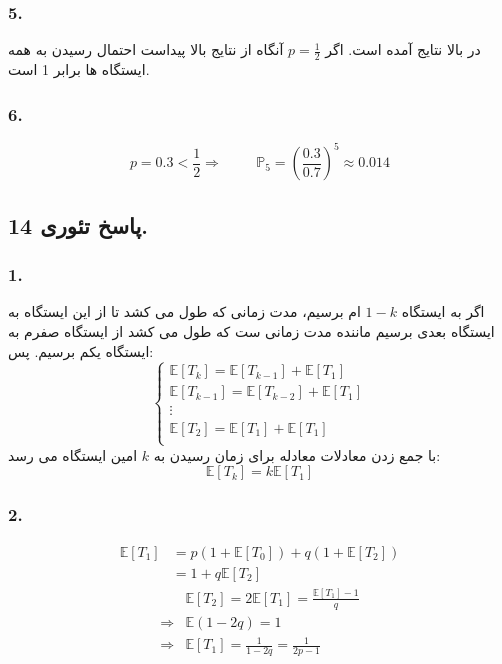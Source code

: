 \documentclass[]{article}
\begin{document}
 \subsubsection{5.}
 در بالا نتایج آمده است. اگر
 $p = \frac{1}{2}$
 آنگاه از نتایج بالا پیداست احتمال رسیدن به همه ایستگاه ها برابر 1 است.
 \subsubsection{6.}
 \begin{equation}
 	\nonumber
 	p = 0.3 < \frac{1}{2} \Rightarrow \hspace{1cm} \mathbb{P}_5 = (\frac{0.3}{0.7})^5 \approx 0.014
 \end{equation}
 \newpage
 \subsection{پاسخ تئوری 14.}
 \subsubsection{1.}
 اگر به ایستگاه $1 - k$ ام برسیم، مدت زمانی که طول می کشد تا از این ایستگاه به ایستگاه بعدی برسیم ماننده مدت زمانی ست که طول می کشد از ایستگاه صفرم به ایستگاه یکم برسیم. پس:
 \begin{equation}
 	\nonumber
 	\begin{cases}
 		 \mathbb{E}[T_k] = \mathbb{E}[T_{k - 1}] + \mathbb{E}[T_1]\\
 		 \mathbb{E}[T_{k-1}] = \mathbb{E}[T_{k - 2}] + \mathbb{E}[T_1]\\
 		\vdots\\
 		 \mathbb{E}[T_2] = \mathbb{E}[T_1] + \mathbb{E}[T_1]\\
 	\end{cases}
 \end{equation}
 با جمع زدن معادلات معادله برای زمان رسیدن به 
 $k$
 امین ایستگاه می رسد:
 \begin{equation}
 	\nonumber
 	\mathbb{E}[T_k] = k\mathbb{E}[T_1]
 \end{equation}
 \subsubsection{2.}
 \begin{equation}
 	\nonumber
 	\begin{split}
 		\mathbb{E}[T_1] &= p (1 + \mathbb{E}[T_0]) + q (1+ \mathbb{E}[T_2])\\
 		& = 1 + q\mathbb{E}[T_2]
 	\end{split}
 \end{equation}
 \begin{equation}
 	\nonumber
 	\begin{split}
 		&\mathbb{E}[T_2] = 2 \mathbb{E}[T_1] = \frac{\mathbb{E}[T_1] - 1}{q}\\
 		\Rightarrow &\mathbb{E}(1 - 2q) = 1\\
 		\Rightarrow &\mathbb{E}[T_1] = \frac{1}{1-2q} = \frac{1}{2p-1}
 	\end{split}
\end{equation}
\end{document}
